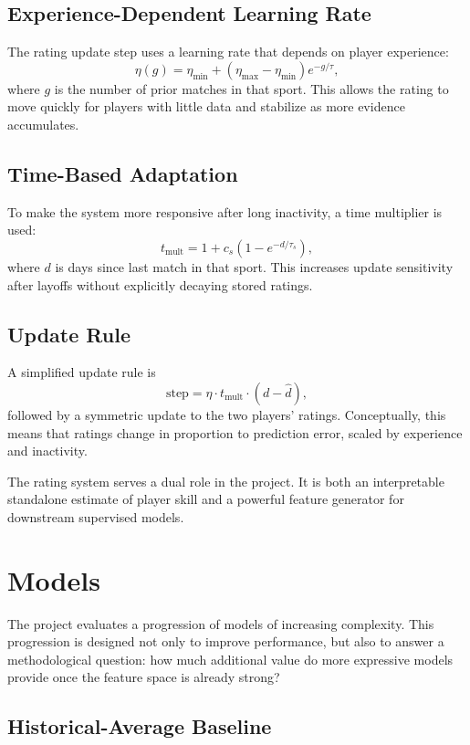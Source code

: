 \documentclass[10pt,twocolumn]{article}
\begin{document}
\subsection{Experience-Dependent Learning Rate}

The rating update step uses a learning rate that depends on player experience:
\[
    \eta(g)
    =
    \eta_{\min}
    +
    (\eta_{\max}-\eta_{\min}) e^{-g/\tau},
\]
where $g$ is the number of prior matches in that sport. This allows the rating to move quickly for players with little data and stabilize as more evidence accumulates.

\subsection{Time-Based Adaptation}

To make the system more responsive after long inactivity, a time multiplier is used:
\[
    t_{\mathrm{mult}}
    =
    1 + c_s \left(1 - e^{-d/\tau_s}\right),
\]
where $d$ is days since last match in that sport. This increases update sensitivity after layoffs without explicitly decaying stored ratings.

\subsection{Update Rule}

A simplified update rule is
\[
    \text{step} = \eta \cdot t_{\mathrm{mult}} \cdot (d - \hat d),
\]
followed by a symmetric update to the two players’ ratings. Conceptually, this means that ratings change in proportion to prediction error, scaled by experience and inactivity.

The rating system serves a dual role in the project. It is both an interpretable standalone estimate of player skill and a powerful feature generator for downstream supervised models.

\section{Models}

The project evaluates a progression of models of increasing complexity. This progression is designed not only to improve performance, but also to answer a methodological question: how much additional value do more expressive models provide once the feature space is already strong?

\subsection{Historical-Average Baseline}
\end{document}
